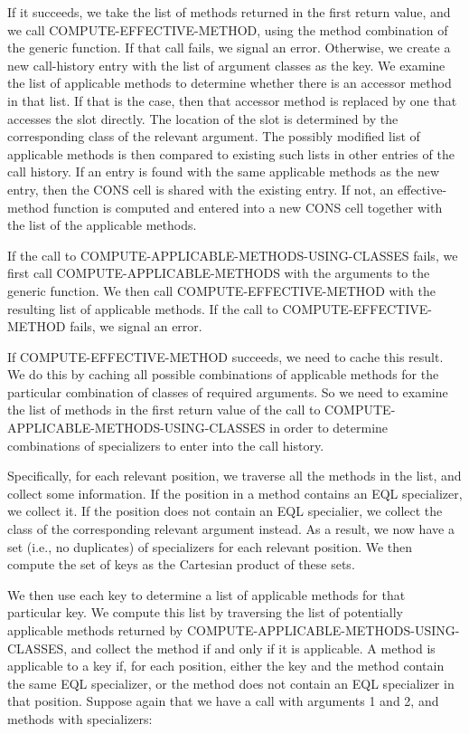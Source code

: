 If it succeeds, we take the list of methods returned in the
first return value, and we call COMPUTE-EFFECTIVE-METHOD, using the
method combination of the generic function.  If that call fails, we
signal an error.  Otherwise, we create a new call-history entry with
the list of argument classes as the key.  We examine the list of
applicable methods to determine whether there is an accessor method in
that list.  If that is the case, then that accessor method is replaced
by one that accesses the slot directly.  The location of the slot is
determined by the corresponding class of the relevant argument.  The
possibly modified list of applicable methods is then compared to
existing such lists in other entries of the call history.  If an entry
is found with the same applicable methods as the new entry, then the
CONS cell is shared with the existing entry.  If not, an
effective-method function is computed and entered into a new CONS cell
together with the list of the applicable methods.

If the call to COMPUTE-APPLICABLE-METHODS-USING-CLASSES fails, we
first call COMPUTE-APPLICABLE-METHODS with the arguments to the
generic function.  We then call COMPUTE-EFFECTIVE-METHOD with the
resulting list of applicable methods.  If the call to
COMPUTE-EFFECTIVE-METHOD fails, we signal an error. 

If COMPUTE-EFFECTIVE-METHOD succeeds, we need to cache this result.
We do this by caching all possible combinations of applicable methods
for the particular combination of classes of required arguments.  So
we need to examine the list of methods in the first return value of
the call to COMPUTE-APPLICABLE-METHODS-USING-CLASSES in order to
determine combinations of specializers to enter into the call history.

Specifically, for each relevant position, we traverse all the methods
in the list, and collect some information.  If the position in a
method contains an EQL specializer, we collect it.  If the position
does not contain an EQL specialier, we collect the class of the
corresponding relevant argument instead.  As a result, we now have a
set (i.e., no duplicates) of specializers for each relevant position.
We then compute the set of keys as the Cartesian product of these sets.

We then use each key to determine a list of applicable methods for
that particular key.  We compute this list by traversing the list of
potentially applicable methods returned by
COMPUTE-APPLICABLE-METHODS-USING-CLASSES, and collect the method if
and only if it is applicable.  A method is applicable to a key if, for
each position, either the key and the method contain the same EQL
specializer, or the method does not contain an EQL specializer in that
position.  Suppose again that we have a call with arguments 1 and 2,
and methods with specializers:
 
